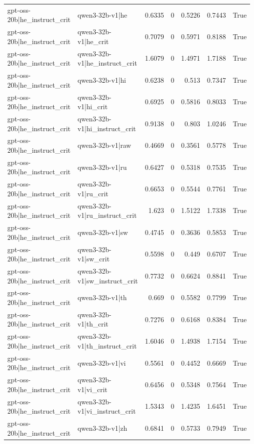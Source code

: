 \begin{table}
\begin{tabular}{l l r r r r l}
gpt-oss-20b|he_instruct_crit & qwen3-32b-v1|he & 0.6335 & 0 & 0.5226 & 0.7443 & True \\
gpt-oss-20b|he_instruct_crit & qwen3-32b-v1|he_crit & 0.7079 & 0 & 0.5971 & 0.8188 & True \\
gpt-oss-20b|he_instruct_crit & qwen3-32b-v1|he_instruct_crit & 1.6079 & 0 & 1.4971 & 1.7188 & True \\
gpt-oss-20b|he_instruct_crit & qwen3-32b-v1|hi & 0.6238 & 0 & 0.513 & 0.7347 & True \\
gpt-oss-20b|he_instruct_crit & qwen3-32b-v1|hi_crit & 0.6925 & 0 & 0.5816 & 0.8033 & True \\
gpt-oss-20b|he_instruct_crit & qwen3-32b-v1|hi_instruct_crit & 0.9138 & 0 & 0.803 & 1.0246 & True \\
gpt-oss-20b|he_instruct_crit & qwen3-32b-v1|raw & 0.4669 & 0 & 0.3561 & 0.5778 & True \\
gpt-oss-20b|he_instruct_crit & qwen3-32b-v1|ru & 0.6427 & 0 & 0.5318 & 0.7535 & True \\
gpt-oss-20b|he_instruct_crit & qwen3-32b-v1|ru_crit & 0.6653 & 0 & 0.5544 & 0.7761 & True \\
gpt-oss-20b|he_instruct_crit & qwen3-32b-v1|ru_instruct_crit & 1.623 & 0 & 1.5122 & 1.7338 & True \\
gpt-oss-20b|he_instruct_crit & qwen3-32b-v1|sw & 0.4745 & 0 & 0.3636 & 0.5853 & True \\
gpt-oss-20b|he_instruct_crit & qwen3-32b-v1|sw_crit & 0.5598 & 0 & 0.449 & 0.6707 & True \\
gpt-oss-20b|he_instruct_crit & qwen3-32b-v1|sw_instruct_crit & 0.7732 & 0 & 0.6624 & 0.8841 & True \\
gpt-oss-20b|he_instruct_crit & qwen3-32b-v1|th & 0.669 & 0 & 0.5582 & 0.7799 & True \\
gpt-oss-20b|he_instruct_crit & qwen3-32b-v1|th_crit & 0.7276 & 0 & 0.6168 & 0.8384 & True \\
gpt-oss-20b|he_instruct_crit & qwen3-32b-v1|th_instruct_crit & 1.6046 & 0 & 1.4938 & 1.7154 & True \\
gpt-oss-20b|he_instruct_crit & qwen3-32b-v1|vi & 0.5561 & 0 & 0.4452 & 0.6669 & True \\
gpt-oss-20b|he_instruct_crit & qwen3-32b-v1|vi_crit & 0.6456 & 0 & 0.5348 & 0.7564 & True \\
gpt-oss-20b|he_instruct_crit & qwen3-32b-v1|vi_instruct_crit & 1.5343 & 0 & 1.4235 & 1.6451 & True \\
gpt-oss-20b|he_instruct_crit & qwen3-32b-v1|zh & 0.6841 & 0 & 0.5733 & 0.7949 & True \\

\end{tabular}
\end{table}
